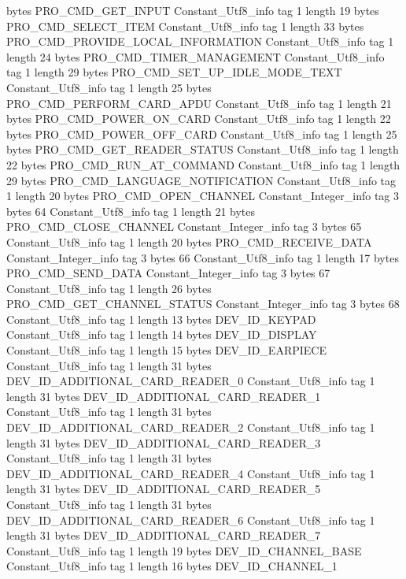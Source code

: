 {{{			bytes	PRO_CMD_GET_INPUT
		}
		Constant_Utf8_info {
			tag	1
			length	19
			bytes	PRO_CMD_SELECT_ITEM
		}
		Constant_Utf8_info {
			tag	1
			length	33
			bytes	PRO_CMD_PROVIDE_LOCAL_INFORMATION
		}
		Constant_Utf8_info {
			tag	1
			length	24
			bytes	PRO_CMD_TIMER_MANAGEMENT
		}
		Constant_Utf8_info {
			tag	1
			length	29
			bytes	PRO_CMD_SET_UP_IDLE_MODE_TEXT
		}
		Constant_Utf8_info {
			tag	1
			length	25
			bytes	PRO_CMD_PERFORM_CARD_APDU
		}
		Constant_Utf8_info {
			tag	1
			length	21
			bytes	PRO_CMD_POWER_ON_CARD
		}
		Constant_Utf8_info {
			tag	1
			length	22
			bytes	PRO_CMD_POWER_OFF_CARD
		}
		Constant_Utf8_info {
			tag	1
			length	25
			bytes	PRO_CMD_GET_READER_STATUS
		}
		Constant_Utf8_info {
			tag	1
			length	22
			bytes	PRO_CMD_RUN_AT_COMMAND
		}
		Constant_Utf8_info {
			tag	1
			length	29
			bytes	PRO_CMD_LANGUAGE_NOTIFICATION
		}
		Constant_Utf8_info {
			tag	1
			length	20
			bytes	PRO_CMD_OPEN_CHANNEL
		}
		Constant_Integer_info {
			tag	3
			bytes	64
		}
		Constant_Utf8_info {
			tag	1
			length	21
			bytes	PRO_CMD_CLOSE_CHANNEL
		}
		Constant_Integer_info {
			tag	3
			bytes	65
		}
		Constant_Utf8_info {
			tag	1
			length	20
			bytes	PRO_CMD_RECEIVE_DATA
		}
		Constant_Integer_info {
			tag	3
			bytes	66
		}
		Constant_Utf8_info {
			tag	1
			length	17
			bytes	PRO_CMD_SEND_DATA
		}
		Constant_Integer_info {
			tag	3
			bytes	67
		}
		Constant_Utf8_info {
			tag	1
			length	26
			bytes	PRO_CMD_GET_CHANNEL_STATUS
		}
		Constant_Integer_info {
			tag	3
			bytes	68
		}
		Constant_Utf8_info {
			tag	1
			length	13
			bytes	DEV_ID_KEYPAD
		}
		Constant_Utf8_info {
			tag	1
			length	14
			bytes	DEV_ID_DISPLAY
		}
		Constant_Utf8_info {
			tag	1
			length	15
			bytes	DEV_ID_EARPIECE
		}
		Constant_Utf8_info {
			tag	1
			length	31
			bytes	DEV_ID_ADDITIONAL_CARD_READER_0
		}
		Constant_Utf8_info {
			tag	1
			length	31
			bytes	DEV_ID_ADDITIONAL_CARD_READER_1
		}
		Constant_Utf8_info {
			tag	1
			length	31
			bytes	DEV_ID_ADDITIONAL_CARD_READER_2
		}
		Constant_Utf8_info {
			tag	1
			length	31
			bytes	DEV_ID_ADDITIONAL_CARD_READER_3
		}
		Constant_Utf8_info {
			tag	1
			length	31
			bytes	DEV_ID_ADDITIONAL_CARD_READER_4
		}
		Constant_Utf8_info {
			tag	1
			length	31
			bytes	DEV_ID_ADDITIONAL_CARD_READER_5
		}
		Constant_Utf8_info {
			tag	1
			length	31
			bytes	DEV_ID_ADDITIONAL_CARD_READER_6
		}
		Constant_Utf8_info {
			tag	1
			length	31
			bytes	DEV_ID_ADDITIONAL_CARD_READER_7
		}
		Constant_Utf8_info {
			tag	1
			length	19
			bytes	DEV_ID_CHANNEL_BASE
		}
		Constant_Utf8_info {
			tag	1
			length	16
			bytes	DEV_ID_CHANNEL_1
}}}
